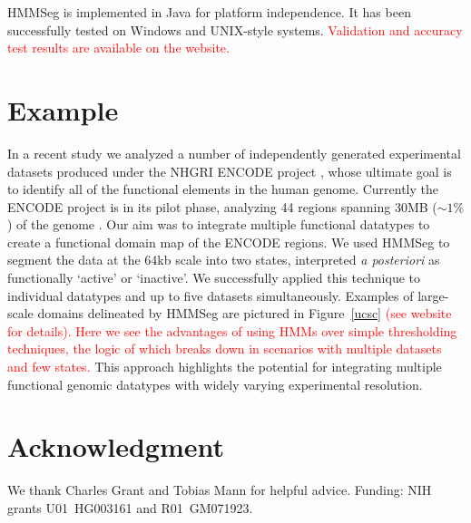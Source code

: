 \documentclass{bioinfo}
\begin{document}
HMMSeg is implemented in Java for platform independence.  It has been
successfully tested on Windows and UNIX-style
systems. \textcolor{red}{Validation and accuracy test results are
available on the website.}

\section{Example}

In a recent study \citep{thurman:identification} we analyzed a number
of independently generated experimental datasets produced under the
NHGRI ENCODE project \citep{encode:encode}, whose ultimate goal is to
identify all of the functional elements in the human genome.
Currently the ENCODE project is in its pilot phase, analyzing 44
regions spanning 30MB ($\sim 1\%$) of the genome
\citep{encode:encode2}.  Our aim was to integrate multiple functional
datatypes to create a functional domain map of the ENCODE regions.  We
used HMMSeg to segment the data at the 64kb scale into two states,
interpreted {\it a posteriori} as functionally `active' or `inactive'.
We successfully applied this technique to individual datatypes and up
to five datasets simultaneously. Examples of large-scale domains
delineated by HMMSeg are pictured in Figure~\ref{ucsc}
\textcolor{red}{(see website for details). Here we see the advantages
of using HMMs over simple thresholding techniques, the logic of which
breaks down in scenarios with multiple datasets and few states.}  This
approach highlights the potential for integrating multiple functional
genomic datatypes with widely varying experimental resolution.

\section*{Acknowledgment}

We thank Charles Grant and Tobias Mann for helpful advice. Funding:
NIH grants U01~HG003161 and R01~GM071923.


\end{document}
